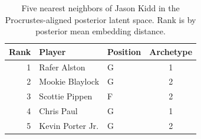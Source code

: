 \begin{table}[htbp]
  \centering\small
  \begin{tabular}{rllc}
    \toprule
    Rank & Player & Position & Archetype \\
    \midrule
    1 & Rafer Alston & G & 1 \\
    2 & Mookie Blaylock & G & 2 \\
    3 & Scottie Pippen & F & 2 \\
    4 & Chris Paul & G & 1 \\
    5 & Kevin Porter Jr. & G & 2 \\
    \bottomrule
  \end{tabular}
  \caption{Five nearest neighbors of Jason Kidd in the Procrustes-aligned posterior latent space. Rank is by posterior mean embedding distance.}
  \label{tab:Jason_Kidd_neighbors}
\end{table}

